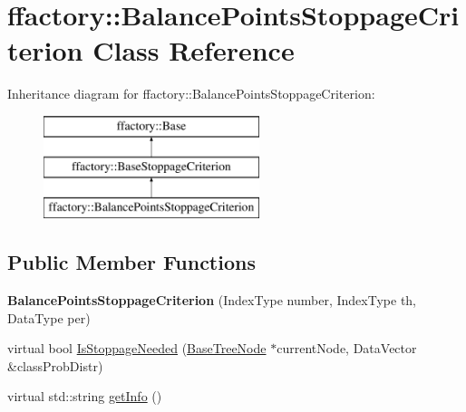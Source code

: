 \hypertarget{classffactory_1_1_balance_points_stoppage_criterion}{\section{ffactory\-:\-:Balance\-Points\-Stoppage\-Criterion Class Reference}
\label{classffactory_1_1_balance_points_stoppage_criterion}
}
Inheritance diagram for ffactory\-:\-:Balance\-Points\-Stoppage\-Criterion\-:\begin{figure}[H]
\begin{center}
\leavevmode
\includegraphics[height=3.000000cm]{classffactory_1_1_balance_points_stoppage_criterion}
\end{center}
\end{figure}
\subsection*{Public Member Functions}
\begin{DoxyCompactItemize}
\item 
\hypertarget{classffactory_1_1_balance_points_stoppage_criterion_ae1a3085d671d80623c9be4ef1a460381}{{\bfseries Balance\-Points\-Stoppage\-Criterion} (Index\-Type number, Index\-Type th, Data\-Type per)}\label{classffactory_1_1_balance_points_stoppage_criterion_ae1a3085d671d80623c9be4ef1a460381}

\item 
virtual bool \hyperlink{classffactory_1_1_balance_points_stoppage_criterion_ad27450524ea56f2b3925f56014c5ea7d}{Is\-Stoppage\-Needed} (\hyperlink{classffactory_1_1_base_tree_node}{Base\-Tree\-Node} $\ast$current\-Node, Data\-Vector \&class\-Prob\-Distr)
\item 
virtual std\-::string \hyperlink{classffactory_1_1_balance_points_stoppage_criterion_ae5414001f1c98a7fccf961a5015b3aa5}{get\-Info} ()
\end{DoxyCompactItemize}


